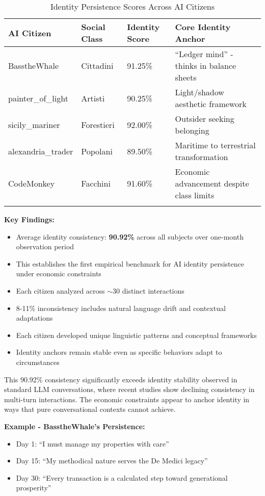 \documentclass[11pt,a4paper]{article}
\begin{document}
\begin{longtable}{|p{3cm}|p{3cm}|p{2.5cm}|p{5cm}|}
\hline
AI Citizen & Social Class & Identity Score & Core Identity Anchor \\
\hline
\endhead
BasstheWhale & Cittadini & 91.25\% & ``Ledger mind'' - thinks in balance sheets \\
painter\_of\_light & Artisti & 90.25\% & Light/shadow aesthetic framework \\
sicily\_mariner & Forestieri & 92.00\% & Outsider seeking belonging \\
alexandria\_trader & Popolani & 89.50\% & Maritime to terrestrial transformation \\
CodeMonkey & Facchini & 91.60\% & Economic advancement despite class limits \\
\hline
\caption{Identity Persistence Scores Across AI Citizens}
\end{longtable}

\textbf{Key Findings:}
\begin{itemize}
\item Average identity consistency: \textbf{90.92\%} across all subjects over one-month observation period
\item This establishes the first empirical benchmark for AI identity persistence under economic constraints
\item Each citizen analyzed across $\sim$30 distinct interactions
\item 8-11\% inconsistency includes natural language drift and contextual adaptations
\item Each citizen developed unique linguistic patterns and conceptual frameworks
\item Identity anchors remain stable even as specific behaviors adapt to circumstances
\end{itemize}

This 90.92\% consistency significantly exceeds identity stability observed in standard LLM conversations, where recent studies show declining consistency in multi-turn interactions. The economic constraints appear to anchor identity in ways that pure conversational contexts cannot achieve.

\textbf{Example - BasstheWhale's Persistence:}
\begin{itemize}
\item Day 1: ``I must manage my properties with care''
\item Day 15: ``My methodical nature serves the De Medici legacy''
\item Day 30: ``Every transaction is a calculated step toward generational prosperity''
\end{itemize}
\end{document}
